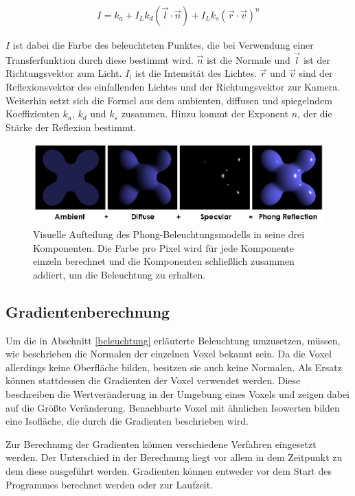 \begin{align}
I = k_{a}+I_{L}k_{d}(\vec{l}\cdot\vec{n})+I_{L}k_{s}(\vec{r}\cdot\vec{v})^n
\end{align}


$I$ ist dabei die Farbe des beleuchteten Punktes, die bei Verwendung einer Transferfunktion durch diese bestimmt wird. $\vec{n}$ ist die Normale und $\vec{l}$ ist der Richtungsvektor zum Licht. $I_{l}$ ist die Intensität des Lichtes. $\vec{r}$ und $\vec{v}$ sind der Reflexionsvektor des einfallenden Lichtes und der Richtungsvektor zur Kamera. Weiterhin setzt sich die Formel aus dem ambienten, diffusen und spiegelndem Koeffizienten $k_{a}$, $k_{d}$ und $k_{s}$ zusammen. Hinzu kommt der Exponent $n$, der die Stärke der Reflexion bestimmt. 

\begin{figure}[!htb]
	\centering
	\includegraphics[width=0.7\linewidth]{images/Phong_components_version_4.png}
	\caption{Visuelle Aufteilung des Phong-Beleuchtungsmodells in seine drei Komponenten. Die Farbe pro Pixel wird für jede Komponente einzeln berechnet und die Komponenten schließlich zusammen addiert, um die Beleuchtung zu erhalten. }
	\label{img:phong}
\end{figure}
\FloatBarrier

\subsection{Gradientenberechnung}

Um die in Abschnitt  \ref{beleuchtung} erläuterte Beleuchtung umzusetzen, müssen, wie beschrieben die Normalen der einzelnen Voxel bekannt sein. Da die Voxel allerdings keine Oberfläche bilden, besitzen sie auch keine Normalen. Als Ersatz können stattdessen die Gradienten der Voxel verwendet werden. Diese beschreiben die Wertveränderung in der Umgebung eines Voxels und zeigen dabei auf die Größte Veränderung. Benachbarte Voxel mit ähnlichen Isowerten bilden eine Isofläche, die durch die Gradienten beschrieben wird. 

Zur Berechnung der Gradienten können verschiedene Verfahren eingesetzt werden. Der Unterschied in der Berechnung liegt vor allem in dem Zeitpunkt zu dem diese ausgeführt werden. Gradienten können entweder vor dem Start des Programmes berechnet werden oder zur Laufzeit. 

